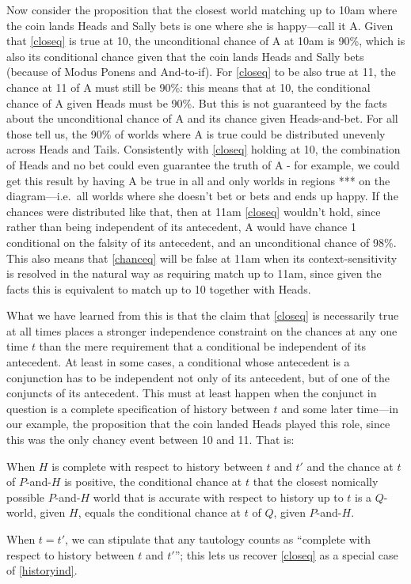 \documentclass[If.tex]{subfiles}
\begin{document}
Now consider the proposition that the closest world matching up to 10am where the coin lands Heads and Sally bets is one where she is happy---call it A.  Given that \ref{closeq} is true at 10, the unconditional chance of A at 10am is 90\%, which is also its conditional chance given that the coin lands Heads and Sally bets (because of Modus Ponens and And-to-if).  For \ref{closeq} to be also true at 11, the chance at 11 of A must still be 90\%: this means that at 10, the conditional chance of A given Heads must be 90\%.  But this is not guaranteed by the facts about the unconditional chance of A and its chance given Heads-and-bet.  For all those tell us, the 90\% of worlds where A is true could be distributed unevenly across Heads and Tails.  Consistently with \ref{closeq} holding at 10, the combination of Heads and no bet could even guarantee the truth of A - for example, we could get this result by having A be true in all and only worlds in regions *** on the diagram---i.e.\ all worlds where she doesn't bet or bets and ends up happy.  If the chances were distributed like that, then at 11am \ref{closeq} wouldn't hold, since rather than being independent of its antecedent, A would have chance 1 conditional on the falsity of its antecedent, and an unconditional chance of 98\%.  This also means that \ref{chanceq} will be false at 11am when its context-sensitivity is resolved in the natural way as requiring match up to 11am, since given the facts this is equivalent to match up to 10 together with Heads.  



What we have learned from this is that the claim that \ref{closeq} is necessarily true at all times places a stronger independence constraint on the chances at any one time $t$ than the mere requirement that a conditional be independent of its antecedent.  At least in some cases, a conditional whose antecedent is a conjunction has to be independent not only of its antecedent, but of one of the conjuncts of its antecedent.  This must at least happen when the conjunct in question is a complete specification of history between $t$ and some later time---in our example, the proposition that the coin landed Heads played this role, since this was the only chancy event between 10 and 11.  That is:
\begin{prop}
	 \label{historyind}
	When $H$ is complete with respect to history between $t$ and $t'$ and the chance at $t$ of $P$-and-$H$ is positive, the conditional chance at $t$ that the closest nomically possible $P$-and-$H$ world that is accurate with respect to history up to $t$ is a $Q$-world, given $H$, equals the conditional chance at $t$ of $Q$, given $P$-and-$H$.	
\end{prop}
When $t = t'$, we can stipulate that any tautology counts as “complete with respect to history between $t$ and $t'$”; this lets us recover \ref{closeq} as a special case of \ref{historyind}.  
\end{document}
